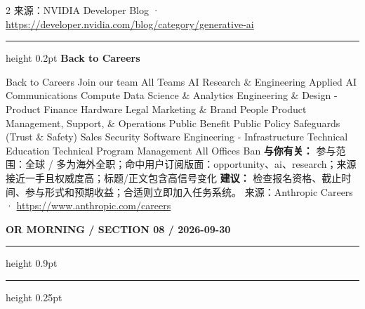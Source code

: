 \documentclass[10.5pt]{ctexart}
\begin{document}
\begin{multicols}{2}
{\footnotesize\color{ormuted} 来源：NVIDIA Developer Blog · \url{https://developer.nvidia.com/blog/category/generative-ai}}
\vspace{2mm}
\hrule height 0.2pt
\vspace{2mm}
{\large\bfseries Back to Careers}\par
Back to Careers Join our team All Teams AI Research \& Engineering Applied AI Communications Compute Data Science \& Analytics Engineering \& Design - Product Finance Hardware Legal Marketing \& Brand People Product Management, Support, \& Operations Public Benefit Public Policy Safeguards (Trust \& Safety) Sales Security Software Engineering - Infrastructure Technical Education Technical Program Management All Offices Ban
\textbf{与你有关：} 参与范围：全球 / 多为海外全职；命中用户订阅版面：opportunity、ai、research；来源接近一手且权威度高；标题/正文包含高信号变化
\textbf{建议：} 检查报名资格、截止时间、参与形式和预期收益；合适则立即加入任务系统。
{\footnotesize\color{ormuted} 来源：Anthropic Careers · \url{https://www.anthropic.com/careers}}
\end{multicols}
\newpage
{\small\bfseries OR MORNING / SECTION 08 / 2026-09-30}
\vspace{2mm}
\hrule height 0.9pt
\vspace{1.5mm}
\hrule height 0.25pt
\vspace{4mm}
\end{document}
